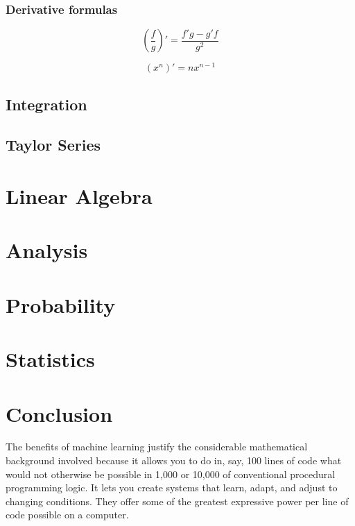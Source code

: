 \documentclass{article}
\begin{document}
\subsubsection{Derivative formulas}

\begin{equation}
\left(\frac{f}{g}\right)' = \frac{f'g - g'f}{g^2}
\end{equation}

\begin{equation}
(x^n)' = nx^{n-1}
\end{equation}

\subsection{Integration}

\subsection{Taylor Series}

\section{Linear Algebra}

\section{Analysis}

\section{Probability}

\section{Statistics}

\section{Conclusion}

The benefits of machine learning justify the considerable mathematical
background involved because it allows you to do in, say, 100 lines of code what
would not otherwise be possible in 1,000 or 10,000 of conventional procedural
programming logic. It lets you create systems that learn, adapt, and adjust to
changing conditions. They offer some of the greatest expressive power per line
of code possible on a computer.
\end{document}
